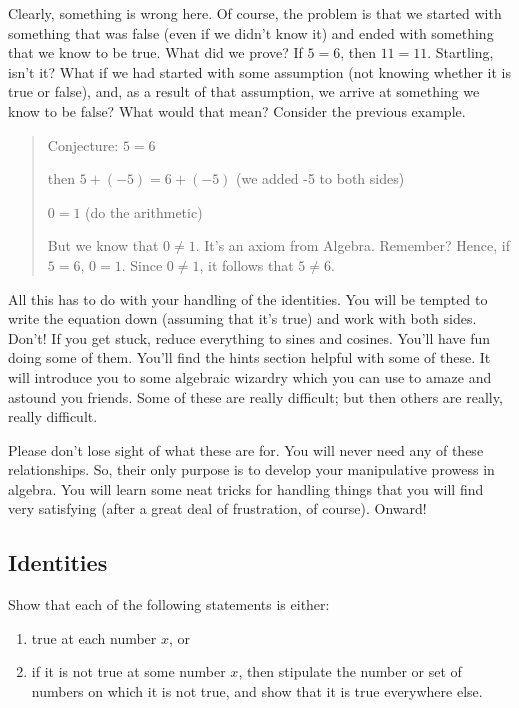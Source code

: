 \documentclass[english]{book}
\begin{document}
Clearly, something is wrong here. Of course, the problem is that we started with something that was false (even if we didn't know it) and ended with something that we know to be true. What did we prove? If $5 = 6$, then $11 = 11$. Startling, isn't it? What if we had started with some assumption (not knowing whether it is true or false), and, as a result of that assumption, we arrive at something we know to be false? What would that mean? Consider the previous example. 

\begin{quote}
  Conjecture: $5 = 6$

  then $5 + (-5) = 6 + (-5)$ (we added -5 to both sides)

  $0 = 1$ (do the arithmetic)

  But we know that $0 \ne 1$. It's an axiom from Algebra. Remember? Hence, if $5 = 6$, $0 = 1$. Since $0 \ne 1$, it follows that $5 \ne 6$.
\end{quote}

All this has to do with your handling of the identities. You will be tempted to write the equation down (assuming that it's true) and work with both sides. Don't! If you get stuck, reduce everything to sines and cosines. You'll have fun doing some of them. You'll find the hints section helpful with some of these. It will introduce you to some algebraic wizardry which you can use to amaze and astound you friends. Some of these are really difficult; but then others are really, really difficult. 

Please don't lose sight of what these are for. You will never need any of these relationships. So, their only purpose is to develop your manipulative prowess in algebra. You will learn some neat tricks for handling things that you will find very satisfying (after a great deal of frustration, of course). Onward!



\newpage
\begin{center}
\section*{Identities}
\end{center}

Show that each of the following statements is either:
\begin{enumerate}[\hspace{1cm}1)]
    \item true at each number $x$, or
    \item if it is not true at some number $x$, then stipulate the number or set of numbers on which it is not true, and show that it is true everywhere else.
\end{enumerate}
\end{document}
